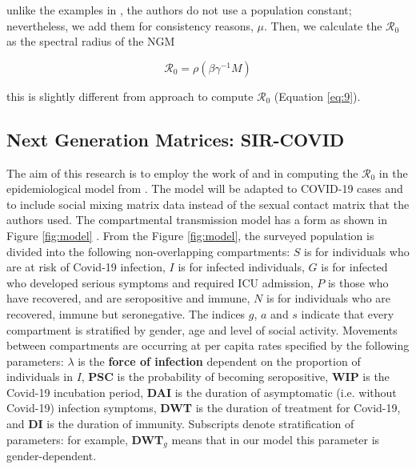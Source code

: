 \documentclass[12pt]{article}
\begin{document}
unlike the examples in \cite{Diekmann:2010}, the authors do not use a population constant; nevertheless, we add them for consistency reasons, $\mu$. Then, we calculate the $\mathcal{R}_{0}$ as the spectral radius of the NGM 

\begin{equation}
\mathcal{R}_{0} = \rho(\beta\gamma^{-1}M)
\end{equation}

this is slightly different from \cite{Klepac2020} approach to compute $\mathcal{R}_{0}$ (Equation \ref{eq:9}). 

\subsection{Next Generation Matrices: SIR-COVID}
\label{sub:2.4}

The aim of this research is to employ the work of \cite{Diekmann:2010} and \cite{Fumanelli:2012} in computing the $\mathcal{R}_{0}$ in the epidemiological model from \cite{Gareth:2013}. The model will be adapted to COVID-19 cases and to include social mixing matrix data instead of the sexual contact matrix that the authors used. The compartmental transmission model has a form as shown in Figure \ref{fig:model} \cite[p.5]{Gareth:2013}. From the Figure \ref{fig:model}, the surveyed population is divided into the following non-overlapping compartments: $S$ is for individuals who are at risk of Covid-19 infection, $I$ is for infected individuals, $G$ is for infected who developed serious symptoms and required ICU admission, $P$ is those who have recovered, and are seropositive and immune, $N$ is for individuals who are recovered, immune but seronegative. The indices $g$, $a$ and $s$ indicate that every compartment is stratified by gender, age and level of social activity. Movements between compartments are occurring at per capita rates specified by the following parameters: $\lambda$ is the \textbf{force of infection} dependent on the proportion of individuals in $I$, \textbf{PSC} is the probability of becoming seropositive, \textbf{WIP} is the Covid-19 incubation period, \textbf{DAI} is the duration of asymptomatic (i.e. without Covid-19) infection symptoms, \textbf{DWT} is the duration of treatment for Covid-19, and \textbf{DI} is the duration of immunity. Subscripts denote stratification of parameters: for example, \textbf{DWT}$_{g}$ means that in our model this parameter is gender-dependent.
\end{document}
